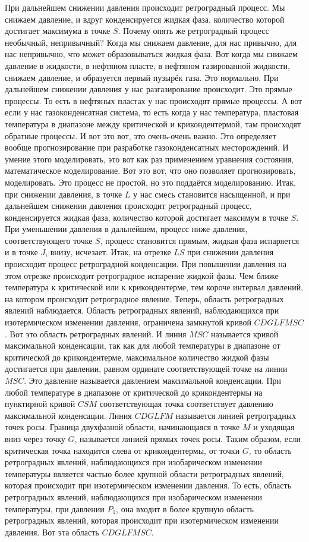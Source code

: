 \documentclass[main.tex]{subfiles}
\begin{document}
При дальнейшем снижении давления происходит ретроградный
процесс.
Мы снижаем давление, и вдруг конденсируется жидкая фаза, количество которой достигает максимума в точке $S$.
Почему опять же ретроградный процесс необычный, непривычный?
Когда мы снижаем давление, для нас привычно, для нас непривычно, что может образовываться жидкая фаза.
Вот когда мы снижаем давление в жидкости, в нефтяном пласте, в нефтяном газированной жидкости, снижаем давление, и образуется первый пузырёк газа.
Это нормально.
При дальнейшем снижении давления у нас разгазирование происходит.
Это прямые процессы.
То есть в нефтяных пластах у нас происходят прямые процессы.
А вот если у нас газоконденсатная система, то есть когда у нас температура, пластовая температура в диапазоне между критической и крикондентермой, там происходят обратные процессы.
И вот это вот, это очень-очень важно.
Это определяет вообще прогнозирование при разработке газоконденсатных месторождений.
И умение этого моделировать, это вот как раз применением уравнения состояния, математическое моделирование.
Вот это вот, что оно позволяет прогнозировать, моделировать.
Это процесс не простой, но это поддаётся моделированию.
Итак, при снижении давления, в точке $L$ у нас смесь становится насыщенной, и при дальнейшем снижении давления происходит ретроградный процесс, конденсируется жидкая фаза, количество которой достигает максимум в точке $S$.
При уменьшении давления в дальнейшем, процесс ниже давления, соответствующего точке $S$, процесс становится прямым, жидкая фаза испаряется и в точке $J$, внизу, исчезает.
Итак, на отрезке $LS$ при снижении давления происходит процесс ретроградной конденсации.
При повышении давления на этом отрезке происходит ретроградное испарение жидкой фазы.
Чем ближе температура к критической или к крикондентерме, тем короче интервал давлений, на котором происходит ретроградное явление.
Теперь, область ретроградных явлений наблюдается.
Область ретроградных явлений, наблюдающихся при изотермическом изменении давления, ограничена замкнутой кривой $CDGLFMSC$.
Вот это область ретроградных явлений.
И линия $MSC$ называется кривой максимальной конденсации, так как для любой температуры в диапазоне от критической до крикондентерме, максимальное количество жидкой фазы достигается при давлении, равном ординате соответствующей точке на линии $MSC$.
Это давление называется давлением максимальной конденсации.
При любой температуре в диапазоне от критической до крикондентермы на пунктирной кривой $CSM$ соответствующая точка соответствует давлению максимальной конденсации.
Линия $CDGLFM$ называется линией ретроградных точек росы.
Граница двухфазной области, начинающаяся в точке $M$ и уходящая вниз через точку $G$, называется линией прямых точек росы.
Таким образом, если критическая точка находится слева от крикондентермы, от точки $G$, то область ретроградных явлений, наблюдающихся при изобарическом изменении температуры является частью более крупной области ретроградных явлений, которая происходит при изотермическом изменении
давления.
То есть, область ретроградных явлений, наблюдающихся при изобарическом изменении температуры, при давлении $P_1$, она входит в более крупную область ретроградных явлений, которая происходит при изотермическом изменении давления.
Вот эта область $CDGLFMSC$.
\end{document}
